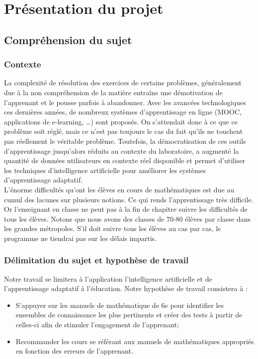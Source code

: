 \chapter{Présentation du projet}

\section{Compréhension du sujet }

\subsection{Contexte}

	La complexité de résolution des exercices de certains problèmes, généralement due à la non compréhension de la matière entraîne une démotivation de l’apprenant et le pousse parfois à abandonner. Avec les avancées technologiques ces dernières années, de nombreux systèmes d’apprentissage en ligne (MOOC, applications de e-learning, …) sont proposés. On s’attendait donc à ce que ce problème soit réglé, mais ce n’est pas toujours le cas du fait qu’ils ne touchent pas réellement le véritable problème. Toutefois, la démocratisation de ces outils d’apprentissage jusqu’alors réduits au contexte du laboratoire, a augmenté la quantité de données utilisateurs en contexte réel disponible et permet d’utiliser les techniques d’intelligence artificielle pour améliorer les systèmes d’apprentissage adaptatif. \\
L’énorme difficultés qu’ont les élèves en cours de mathématiques est due au cumul des lacunes sur plusieurs notions. Ce qui rends l’apprentissage très difficile. Or l’enseignant en classe ne peut pas à la fin de chapitre suivre les difficultés de tous les élèves. Notons que nous avons des classes de 70-80 élèves par classe dans les grandes métropoles. S’il doit suivre tous les élèves au cas par cas, le programme ne tiendrai pas sur les délais impartis. 

\subsection{Délimitation du sujet et hypothèse de travail }
	
	Notre travail se limitera à l’application l’intelligence artificielle et de l’apprentissage adaptatif à l'éducation. Notre hypothèse de travail consistera à : 
	\begin{itemize}
		\item S’appuyer sur les manuels de mathématique de 6e pour identifier les ensembles de connaissance les plus pertinents et créer des tests à partir de celles-ci afin de stimuler l’engagement de l’apprenant; 
		\item Recommander les cours se référant aux manuels de mathématiques appropriés en fonction des erreurs de l’apprenant.
	\end{itemize}

